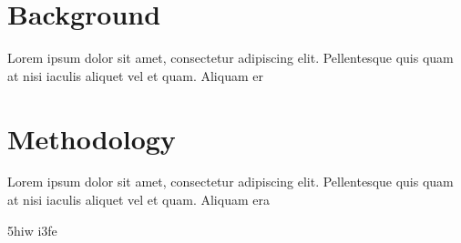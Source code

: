 \documentclass{UoYCSproject}
\begin{document}
\chapter{Background}
\label{cha:background}
Lorem ipsum dolor sit amet, consectetur adipiscing elit. Pellentesque
quis quam at nisi iaculis aliquet vel et quam. Aliquam er

\chapter{Methodology}
\label{cha:methodology}
Lorem ipsum dolor sit amet, consectetur adipiscing elit. Pellentesque
quis quam at nisi iaculis aliquet vel et quam. Aliquam era

    5hiw i3fe
\printbibliography
\end{document}
